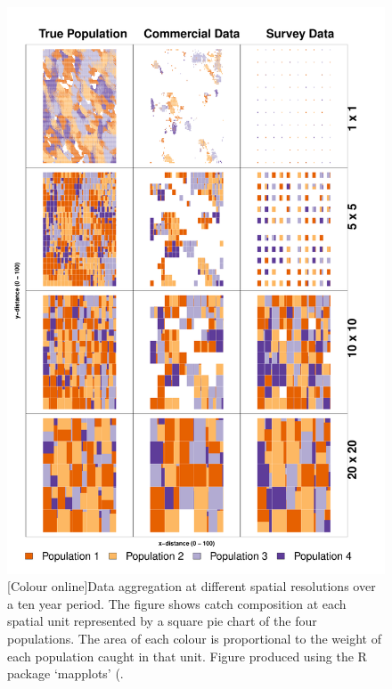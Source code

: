 \documentclass[preprint]{elsarticle}
\begin{document}
\begin{figure}[!ht]
	\includegraphics[width=\linewidth]{../analysis/Data_Aggregation_space_Rev3}
	\caption{[Colour online]Data aggregation at different spatial resolutions
		over a ten year period. The figure shows catch
			composition at each spatial unit represented by a
			square pie chart of the four populations. The area of
			each colour is proportional to the weight of each
			population caught in that unit. Figure produced using
			the R package `mapplots' (\cite{Gerritsen2014}.
	}
	\label{fig:1}
\end{figure}	
\end{document}
